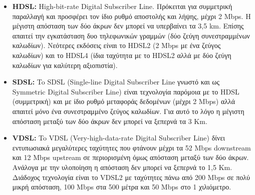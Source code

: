 \begin{itemize}
\item \textbf{HDSL:} High-bit-rate Digital Subscriber Line. Πρόκειται για συμμετρική παραλλαγή και προσφέρει τον ίδιο ρυθμό αποστολής και λήψης, μέχρι 2 Mbps. Η μέγιστη απόσταση των δύο άκρων δεν μπορεί να υπερβαίνει τα 3,5 km. Επίσης απαιτεί την εγκατάσταση δυο τηλεφωνικών γραμμών (δύο ζεύγη συνεστραμμένων καλωδίων). Νεότερες εκδόσεις είναι το HDSL2 (2 Mbps με ένα ζεύγος καλωδίων) και το HDSL4 (ίδια ταχύτητα με το HDSL2 αλλά με δύο ζεύγη καλωδίων για καλύτερη αξιοπιστία).
\item \textbf{SDSL:} To SDSL (Single-line Digital Subscriber Line γνωστό και ως Sym\-met\-ric Digital Subscriber Line) είναι τεχνολογία παρόμοια με το HDSL (συμμετρική) και με ίδιο ρυθμό μεταφοράς δεδομένων (μέχρι 2 Mbps) αλλά απαιτεί μόνο ένα συνεστραμμένο ζεύγος καλωδίων. Για αυτό το λόγο η μέγιστη απόσταση μεταξύ των δύο άκρων δεν μπορεί να ξεπερνά τα 3 Km.
\item \textbf{VDSL:} To VDSL (Very-high-data-rate Digital Subscriber Line) δίνει εντυπωσιακά μεγαλύτερες ταχύτητες που φτάνουν μέχρι τα 52 Mbps downstream και 12 Mbps upstream σε περιορισμένη όμως απόσταση μεταξύ των δύο άκρων. Ανάλογα με την υλοποίηση η απόσταση δεν μπορεί να ξεπερνά το 1,5 Km. Διάδοχος τεχνολογία είναι το VDSL2 με ταχύτητες πάνω από 200 Mbps σε πολύ μικρή απόσταση, 100 Mbps στα 500 μέτρα και 50 Mbps στο 1 χιλιόμετρο.
\end{itemize}

